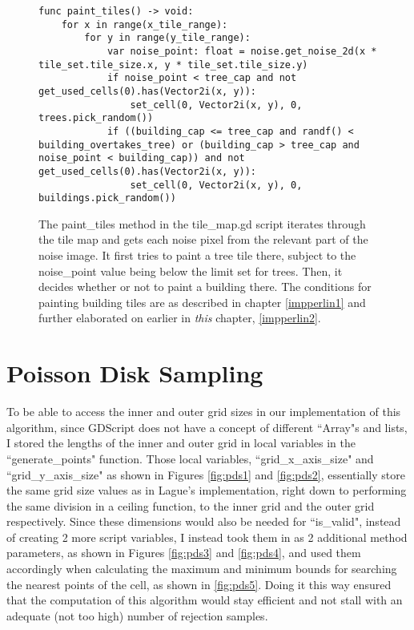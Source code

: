 \begin{figure}[H]
    \centering
    \begin{lstlisting}
func paint_tiles() -> void:
	for x in range(x_tile_range):
		for y in range(y_tile_range):
			var noise_point: float = noise.get_noise_2d(x * tile_set.tile_size.x, y * tile_set.tile_size.y)
			if noise_point < tree_cap and not get_used_cells(0).has(Vector2i(x, y)):
				set_cell(0, Vector2i(x, y), 0, trees.pick_random())
			if ((building_cap <= tree_cap and randf() < building_overtakes_tree) or (building_cap > tree_cap and noise_point < building_cap)) and not get_used_cells(0).has(Vector2i(x, y)):
				set_cell(0, Vector2i(x, y), 0, buildings.pick_random())
    \end{lstlisting}
    \caption{The paint\_tiles method in the tile\_map.gd script iterates through the tile map and gets each noise pixel from the relevant part of the noise image. It first tries to paint a tree tile there, subject to the noise\_point value being below the limit set for trees. Then, it decides whether or not to paint a building there. The conditions for painting building tiles are as described in chapter \ref{impperlin1} and further elaborated on earlier in \textit{this} chapter, \ref{impperlin2}.}
    \label{fig:simplex3}
\end{figure}

\section{Poisson Disk Sampling}

To be able to access the inner and outer grid sizes in our implementation of this algorithm, since GDScript does not have a concept of different ``Array"s and lists, I stored the lengths of the inner and outer grid in local variables in the ``generate\_points" function. Those local variables, ``grid\_x\_axis\_size" and ``grid\_y\_axis\_size" as shown in Figures \ref{fig:pds1} and \ref{fig:pds2}, essentially store the same grid size values as in Lague's implementation, right down to performing the same division in a ceiling function, to the inner grid and the outer grid respectively. Since these dimensions would also be needed for ``is\_valid", instead of creating 2 more script variables, I instead took them in as 2 additional method parameters, as shown in Figures \ref{fig:pds3} and \ref{fig:pds4}, and used them accordingly when calculating the maximum and minimum bounds for searching the nearest points of the cell, as shown in \ref{fig:pds5}. Doing it this way ensured that the computation of this algorithm would stay efficient and not stall with an adequate (not too high) number of rejection samples.

